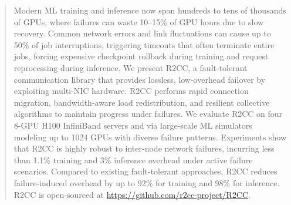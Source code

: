 \begin{abstract}
Modern ML training and inference now span hundreds to tens of thousands of GPUs, where failures can waste 10–15\% of GPU hours due to slow recovery. Common network errors and link fluctuations can cause up to 50\% of job interruptions, triggering timeouts that often terminate entire jobs, forcing expensive checkpoint rollback during training and request reprocessing during inference. We present R2CC, a fault-tolerant communication library that provides lossless, low-overhead failover by exploiting multi-NIC hardware. R2CC performs rapid connection migration, bandwidth-aware load redistribution, and resilient collective algorithms to maintain progress under failures. We evaluate R2CC on four 8-GPU H100 InfiniBand servers and via large-scale ML simulators modeling up to 1024 GPUs with diverse failure patterns. Experiments show that R2CC is highly robust to inter-node network failures, incurring less than 1.1\% training and 3\% inference overhead under active failure scenarios. Compared to existing fault-tolerant approaches, R2CC reduces failure-induced overhead by up to 92\% for training and 98\% for inference. R2CC is open-sourced at \url{https://github.com/r2cc-project/R2CC}.

\end{abstract}
